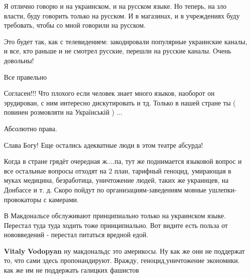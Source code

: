 \begin{itemize}

Я отлично говорю и на украинском, и на русском языке. Но теперь, на зло власти,
буду говорить только на русском. И в магазинах, и в учреждениях буду требовать,
чтобы со мной говорили на русском.

Это будет так, как с телевидением: закодировали популярные украинские каналы, и
все, кто раньше и не смотрел русские, перешли на русские каналы. Очень
довольны!

Все правельно

Согласен!!! Что плохого если человек знает много языков, наоборот он
эрудирован, с ним интересно дискутировать и тд.  Только в нашей стране ты (
повинен розмовляти на Українській ) ...

Абсолютно права.

Слава Богу! Еще остались адекватные люди в этом театре абсурда!


Когда в стране грядёт очередная ж....па, тут же поднимается языковой вопрос и
все остальные вопросы отходят на 2 план, тарифный геноцид, умирающая в муках
медицина, безработица, уничтожение людей, таких же украинцев, на Донбассе и т.
д. Скоро пойдут по организациям-заведениям мовные ушлепки-провокаторы с
камерами.


В Макдональсе обслуживают принципиально только на украинском языке. Перестал
туда туда ходить тоже принципиально.  Вот видите есть польза от нововведений -
перестал питаться вредной едой. \Laughey[1.0][white]

\begin{itemize}
\textbf{Vitaly Vodopyan} ну макдональдс это америкосы. Ну как же они не
поддержат то, что сами здесь пропонандируют. Вражду, геноцид,уничтожение
экономики. как же им не поддержать галицких фашистов
\end{itemize}


\end{itemize}
